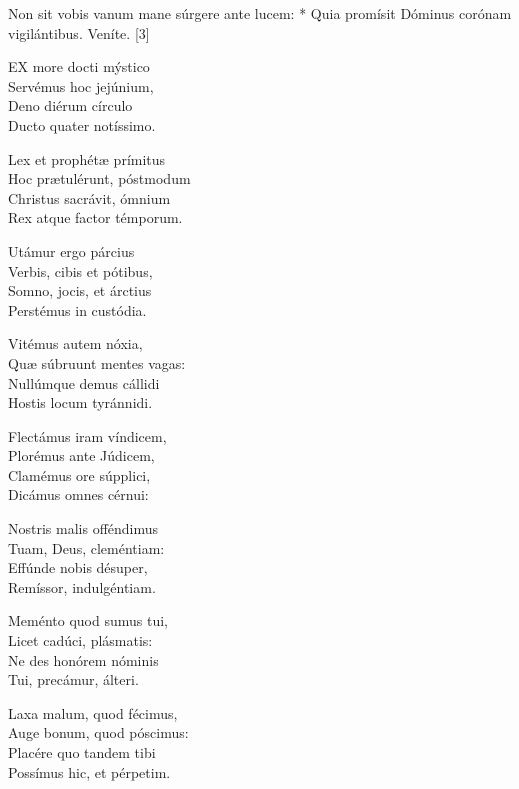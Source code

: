 


 Non sit vobis vanum mane súrgere ante lucem: * Quia promísit Dóminus corónam vigilántibus.  Veníte. [3]


\lettrine[lines=2]{E}{X} more docti mýstico\\
Servémus hoc jejúnium,\\
Deno diérum círculo\\
Ducto quater notíssimo.

Lex et prophétæ prímitus\\
Hoc prætulérunt, póstmodum\\
Christus sacrávit, ómnium\\
Rex atque factor témporum.

Utámur ergo párcius\\
Verbis, cibis et pótibus,\\
Somno, jocis, et árctius\\
Perstémus in custódia.

Vitémus autem nóxia,\\
Quæ súbruunt mentes vagas:\\
Nullúmque demus cállidi\\
Hostis locum tyránnidi.

Flectámus iram víndicem,\\
Plorémus ante Júdicem,\\
Clamémus ore súpplici,\\
Dicámus omnes cérnui:

Nostris malis offéndimus\\
Tuam, Deus, cleméntiam:\\
Effúnde nobis désuper,\\
Remíssor, indulgéntiam.

Meménto quod sumus tui,\\
Licet cadúci, plásmatis:\\
Ne des honórem nóminis\\
Tui, precámur, álteri.

Laxa malum, quod fécimus,\\
Auge bonum, quod póscimus:\\
Placére quo tandem tibi\\
Possímus hic, et pérpetim.

